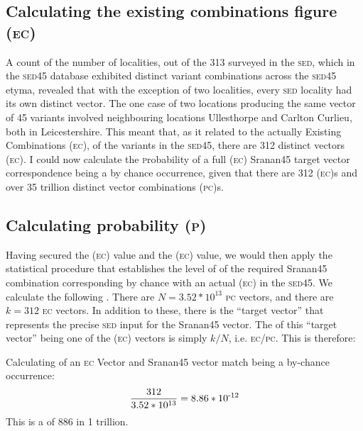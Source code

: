 \subsection{Calculating the existing combinations figure (\textsc{ec})} \label{4.1.2}
A count of the number of localities, out of the 313 surveyed in the \textsc{sed}, which in the \textsc{sed45} database exhibited distinct variant combinations across the \textsc{sed45} etyma, revealed that with the exception of two localities, every \textsc{sed} locality had its own distinct vector. The one case of two locations producing the same vector of 45 variants involved neighbouring locations Ullesthorpe and Carlton Curlieu, both in Leicestershire. This meant that, as it related to the actually Existing Combinations (\textsc{ec}), of the variants in the \textsc{sed45}, there are 312 distinct vectors (\textsc{ec}). I could now calculate the \textsc{p}robability of a full (\textsc{ec}) Sranan45 target vector correspondence being a by chance occurrence, given that there are 312 (\textsc{ec})s and over 35 trillion distinct vector combinations (\textsc{pc})s.

\subsection{Calculating probability (\textsc{p})} \label{4.1.3}
Having secured the (\textsc{ec}) value and the (\textsc{ec}) value, we would then apply the statistical procedure that establishes the level of  of the required Sranan45 combination corresponding by chance with an actual (\textsc{ec}) in the \textsc{sed45}. We calculate the following . There are $N = 3.52 \ast 10^{13}$ \textsc{pc} vectors, and there are $k = 312$ \textsc{ec} vectors. In addition to these, there is the ``target vector'' that represents the precise \textsc{sed} input for the Sranan45 vector. The  of this ``target vector'' being one of the (\textsc{ec}) vectors is simply $k/N$, i.e. \textsc{ec}/\textsc{pc}. This  is therefore:

\ea
\label{exTable 4.2}
{Calculating  of an \textsc{ec} Vector and Sranan45 vector match being a by-chance occurrence}:\\
\[\frac{312}{3.52 \ast 10^{13}}  =   8.86 \ast 10\textsuperscript{-12} \]
This is a  of 886 in 1 trillion.
\z

